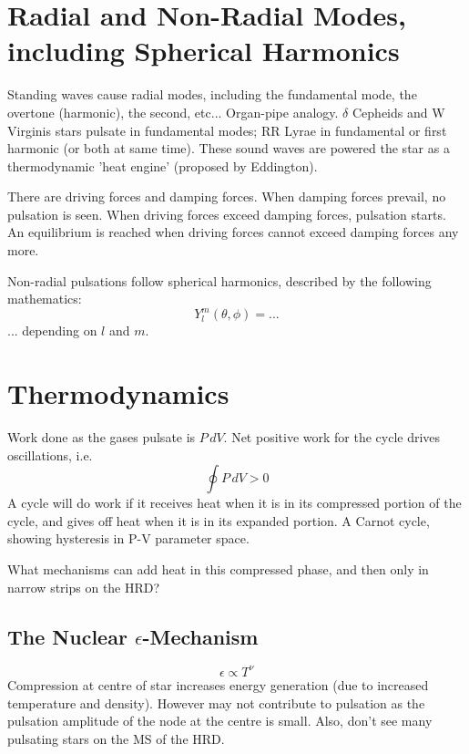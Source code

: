 \documentclass{spy}
\begin{document}
\section{Radial and Non-Radial Modes, including Spherical Harmonics}
Standing waves cause radial modes, including the fundamental mode, the overtone (harmonic), the second, etc... Organ-pipe analogy. 
\(\delta\) Cepheids and W Virginis stars pulsate in fundamental modes; RR Lyrae in fundamental or first harmonic (or both at same time).  
These sound waves are powered the star as a thermodynamic 'heat engine' (proposed by Eddington). 

There are driving forces and damping forces. When damping forces prevail, no pulsation is seen. When driving forces exceed damping forces, pulsation starts. An equilibrium is reached when driving forces cannot exceed damping forces any more. 

Non-radial pulsations follow spherical harmonics, described by the following mathematics:
\begin{equation}
    Y^m_l (\theta, \phi) = ...
\end{equation}
... depending on \(l\) and \(m\). 

\section{Thermodynamics}
Work done as the gases pulsate is \(P \,dV\). 
Net positive work for the cycle drives oscillations, i.e.
\begin{equation}
    \oint P \,dV > 0
\end{equation}
A cycle will do work if it receives heat when it is in its compressed portion of the cycle, and gives off heat when it is in its expanded portion.
A Carnot cycle, showing hysteresis in P-V parameter space.

What mechanisms can add heat in this compressed phase, and then only in narrow strips on the HRD?

\subsection{The Nuclear \(\epsilon\)-Mechanism}
\begin{equation}
\epsilon \propto T^\nu
\end{equation}
Compression at centre of star increases energy generation (due to increased temperature and density). However may not contribute to pulsation as the pulsation amplitude of the node at the centre is small. Also, don't see many pulsating stars on the MS of the HRD.
\end{document}
